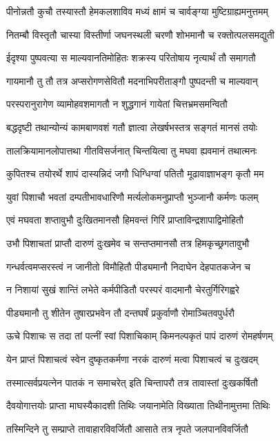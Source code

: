 \twolineshloka
{पीनोन्नतौ कुचौ तस्यास्तौ हेमकलशाविव}
{मध्यं क्षामं च चार्वङ्ग्या मुष्टिग्राह्यमनुत्तमम्}%

\twolineshloka
{नितम्बौ विस्तृतौ चास्या विस्तीर्णा जघनस्थली}
{चरणौ शोभमानौ च रक्तोत्पलसमद्युती}%

\twolineshloka
{ईदृश्या पुष्पवत्या स माल्यवानतिमोहितः}
{शक्रस्य परितोषाय नृत्यार्थं तौ समागतौ}%

\twolineshloka
{गायमानौ तु तौ तत्र अप्सरोगणसेवितौ}
{मदनाभिपरीताङ्गौ पुष्पदन्ती च माल्यवान्}%

\twolineshloka
{परस्परानुरागेण व्यामोहवशमागतौ}
{न शुद्धगानं गायेतां चित्तभ्रमसमन्वितौ}%

\twolineshloka
{बद्धदृष्टी तथान्योन्यं कामबाणवशं गतौ}
{ज्ञात्वा लेखर्षभस्तत्र सङ्गतं मानसं तयोः}%

\twolineshloka
{तालक्रियामानलोपात्तथा गीतविसर्जनात्}
{चिन्तयित्वा तु मघवा ह्यवमानं तथात्मनः}%

\twolineshloka
{कुपितश्च तयोरर्थे शापं दास्यन्निदं जगौ}
{धिग्धिग्वां पतितौ मूढावाज्ञाभङ्ग कृतौ मम}%

\twolineshloka
{युवां पिशाचौ भवतां दम्पतीभावधारिणौ}
{मर्त्यलोकमनुप्राप्तौ भुञ्जानौ कर्मणः फलम्}%

\twolineshloka
{एवं मघवता शप्तावुभौ दुःखितमानसौ}
{हिमवन्तं गिरिं प्राप्ताविन्द्रशापाद्विमोहितौ}%

\twolineshloka
{उभौ पिशाचतां प्राप्तौ दारुणं दुःखमेव च}
{सन्तप्तमानसौ तत्र हिमकृच्छ्रगतावुभौ}%

\twolineshloka
{गन्धर्वत्वमप्सरस्त्वं न जानीतो विमौहितौ}
{पीड्यमानौ निदाघेन देहपातकजेन च}%

\twolineshloka
{न निशायां सुखं शान्तिं लभेते कर्मपीडितौ}
{परस्परं वादमानौ चेरतुर्गिरिगह्वरे}%

\twolineshloka
{पीड्यमानौ तु शीतेन तुषारप्रभवेन तौ}
{दन्तघर्षं प्रकुर्वाणौ रोमाञ्चितवपुर्धरौ}%

\twolineshloka
{ऊचे पिशाचः स तदा तां पत्नीं स्वां पिशाचिकाम्}
{किमनल्पकृतं पापं दारुणं रोमहर्षणम्}%

\twolineshloka
{येन प्राप्तं पिशाचत्वं स्वेन दुष्कृतकर्मणा}
{नरकं दारुणं मत्वा पिशाचत्वं च दुःखदम्}%

\twolineshloka
{तस्मात्सर्वप्रयत्नेन पातकं न समाचरेत्}
{इति चिन्तापरौ तत्र तावास्तां दुःखकर्षितौ}%

\twolineshloka
{दैवयोगात्तयोः प्राप्ता माघस्यैकादशी तिथिः}
{जयानामेति विख्याता तिथीनामुत्तमा तिथिः}%

\twolineshloka
{तस्मिन्दिने तु सम्प्राप्ते तावाहारविवर्जितौ}
{आसाते तत्र नृपते जलपानविवर्जितौ}%

